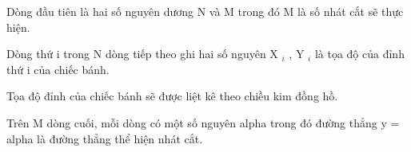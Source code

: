 Dòng đầu tiên là hai số nguyên dương N và M trong đó M là số nhát cắt sẽ thực hiện.  

   Dòng thứ i trong N dòng tiếp theo ghi hai số nguyên X   $_    i   $   , Y   $_    i   $   là tọa độ của đỉnh thứ i của chiếc bánh.  

   Tọa độ đỉnh của chiếc bánh sẽ được liệt kê theo chiều kim đồng hồ.  

   Trên M dòng cuối, mỗi dòng có một số nguyên alpha trong đó đường thẳng y = alpha là đường thẳng thể hiện nhát cắt.  

\